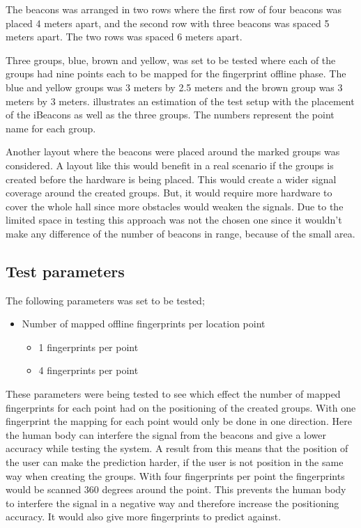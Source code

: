 \bigskip

The beacons was arranged in two rows where the first row of four beacons was placed 4 meters apart, and the second row with three beacons was spaced 5 meters apart.
The two rows was spaced 6 meters apart.

\bigskip


Three groups, blue, brown and yellow, was set to be tested where each of the groups had nine points each to be mapped for the fingerprint offline phase.
The blue and yellow groups was 3 meters by 2.5 meters and the brown group was 3 meters by 3 meters.
 illustrates an estimation of the test setup with the placement of the iBeacons as well as the three groups.
The numbers represent the point name for each group.


Another layout where the beacons were placed around the marked groups was considered.
A layout like this would benefit in a real scenario if the groups is created before the hardware is being placed.
This would create a wider signal coverage around the created groups.
But, it would require more hardware to cover the whole hall since more obstacles would weaken the signals.
Due to the limited space in testing this approach was not the chosen one since it wouldn't make any difference of the number of beacons in range, because of the small area.

\newpage

\subsection{Test parameters}\label{sec:methodTestParameters}
The following parameters was set to be tested;

\begin{itemize}
\item Number of mapped offline fingerprints per location point
	\begin{itemize}
		\item 1 fingerprints per point
		\item 4 fingerprints per point
	\end{itemize}
\end{itemize}

These parameters were being tested to see which effect the number of mapped fingerprints for each point had on the positioning of the created groups.
With one fingerprint the mapping for each point would only be done in one direction.
Here the human body can interfere the signal from the beacons and give a lower accuracy while testing the system.
A result from this means that the position of the user can make the prediction harder, if the user is not position in the same way when creating the groups.
With four fingerprints per point the fingerprints would be scanned 360 degrees around the point. 
This prevents the human body to interfere the signal in a negative way and therefore increase the positioning accuracy.
It would also give more fingerprints to predict against.
